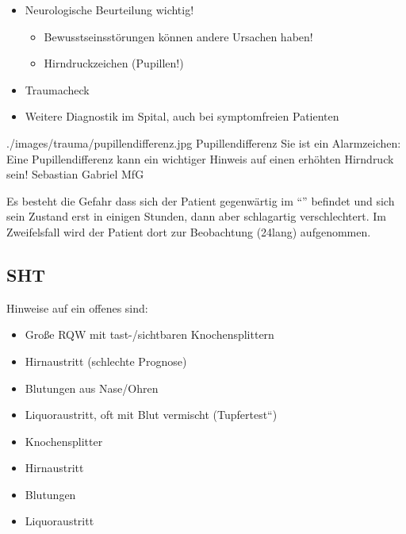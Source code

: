 {
\begin{itemize}
  \item Neurologische Beurteilung wichtig!
  \begin{itemize}
    \item Bewusstseinsstörungen können andere Ursachen
    haben!
    \item Hirndruckzeichen (Pupillen!)
  \end{itemize}
  \item Traumacheck
  \item Weitere Diagnostik im Spital, auch bei symptomfreien
  Patienten
  
\end{itemize}}%
{./images/trauma/pupillendifferenz.jpg}%
{Pupillendifferenz}%
{Sie ist ein Alarmzeichen: Eine Pupillendifferenz kann ein
wichtiger Hinweis auf einen erhöhten Hirndruck sein!}%
{Sebastian Gabriel}%
{MfG}%

\begin{Danger}
  \item {} Es besteht
  die Gefahr dass sich der Patient gegenwärtig im
  \protect\enquote{} 
  befindet und sich sein Zustand erst in einigen Stunden, dann
  aber schlagartig verschlechtert. Im Zweifelsfall wird der
  Patient dort zur Beobachtung (24\Hour* lang) aufgenommen.
\end{Danger}



\subsection{ SHT}

{%
Hinweise auf ein offenes  sind:

\begin{itemize}
    \item Große RQW mit tast-/sichtbaren  Knochensplittern
    \item Hirnaustritt (schlechte Prognose)
    \item Blutungen aus Nase/Ohren
    \item Liquoraustritt, oft mit Blut vermischt
    ({\quotedblbase}Tupfertest{\textquotedblleft})
\end{itemize}
}{
\begin{itemize}
  \item Knochensplitter
  \item Hirnaustritt
  \item Blutungen
  \item Liquoraustritt
\end{itemize}
}{}{}{}


